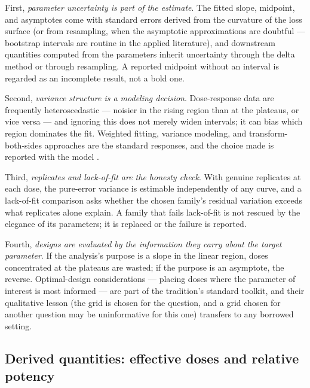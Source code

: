 First, \emph{parameter uncertainty is part of the estimate}. The fitted slope, midpoint, and asymptotes come with standard errors derived from the curvature of the loss surface (or from resampling, when the asymptotic approximations are doubtful --- bootstrap intervals are routine in the applied literature), and downstream quantities computed from the parameters inherit uncertainty through the delta method or through resampling. A reported midpoint without an interval is regarded as an incomplete result, not a bold one.

Second, \emph{variance structure is a modeling decision}. Dose-response data are frequently heteroscedastic --- noisier in the rising region than at the plateaus, or vice versa --- and ignoring this does not merely widen intervals; it can bias which region dominates the fit. Weighted fitting, variance modeling, and transform-both-sides approaches are the standard responses, and the choice made is reported with the model \cite{ritz}.

Third, \emph{replicates and lack-of-fit are the honesty check}. With genuine replicates at each dose, the pure-error variance is estimable independently of any curve, and a lack-of-fit comparison asks whether the chosen family's residual variation exceeds what replicates alone explain. A family that fails lack-of-fit is not rescued by the elegance of its parameters; it is replaced or the failure is reported.

Fourth, \emph{designs are evaluated by the information they carry about the target parameter}. If the analysis's purpose is a slope in the linear region, doses concentrated at the plateaus are wasted; if the purpose is an asymptote, the reverse. Optimal-design considerations --- placing doses where the parameter of interest is most informed --- are part of the tradition's standard toolkit, and their qualitative lesson (the grid is chosen for the question, and a grid chosen for another question may be uninformative for this one) transfers to any borrowed setting.

\subsection{Derived quantities: effective doses and relative potency}\label{ch02:dose:derived}

